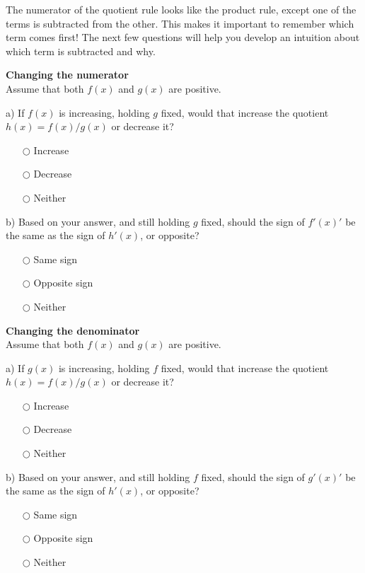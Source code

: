 \documentclass[pdftex, brazil, 12pt, twoside]{article}
\begin{document}
The numerator of the quotient rule looks like the product rule, except one of
the terms is subtracted from the other. This makes it important to remember which
term comes first! The next few questions will help you develop an intuition about
which term is subtracted and why.

\begin{exercise}
  \textbf{Changing the numerator}\\%
  Assume that both $f(x)$ and $g(x)$ are positive.

  a) If $f(x)$ is increasing, holding $g$ fixed, would that increase the quotient
  $h(x) = f(x)/g(x)$ or decrease it?
  \begin{itemize}[noitemsep]
  \item[$\bigcirc$] Increase
  \item[$\bigcirc$] Decrease
  \item[$\bigcirc$] Neither
  \end{itemize}

  b) Based on your answer, and still holding $g$ fixed, should the sign of
  $f'(x)'$ be the same as the sign of $h'(x)$, or opposite?
  \begin{itemize}[noitemsep]
  \item[$\bigcirc$] Same sign
  \item[$\bigcirc$] Opposite sign
  \item[$\bigcirc$] Neither
  \end{itemize}
\end{exercise}

\begin{exercise}
  \textbf{Changing the denominator}\\%
  Assume that both $f(x)$ and $g(x)$ are positive.

  a) If $g(x)$ is increasing, holding $f$ fixed, would that increase the quotient
  $h(x) = f(x)/g(x)$ or decrease it?
  \begin{itemize}[noitemsep]
  \item[$\bigcirc$] Increase
  \item[$\bigcirc$] Decrease
  \item[$\bigcirc$] Neither
  \end{itemize}

  b) Based on your answer, and still holding $f$ fixed, should the sign of
  $g'(x)'$ be the same as the sign of $h'(x)$, or opposite?
  \begin{itemize}[noitemsep]
  \item[$\bigcirc$] Same sign
  \item[$\bigcirc$] Opposite sign
  \item[$\bigcirc$] Neither
  \end{itemize}
\end{exercise}
\end{document}
